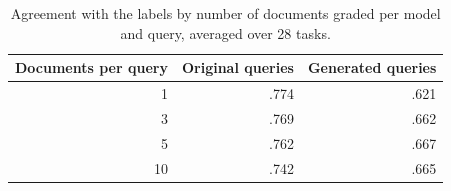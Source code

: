 \begin{table}[t]
\centering\small
\begin{tabular}{rrr}
\toprule
Documents per query & Original queries & Generated queries \\
\midrule
1 & .774 & .621 \\
3 & .769 & .662 \\
5 & .762 & .667 \\
10 & .742 & .665 \\
\bottomrule
\end{tabular}
\caption{Agreement with the labels by number of documents graded per model and query, averaged over 28 tasks.}
\label{tab:num_documents}
\end{table}
